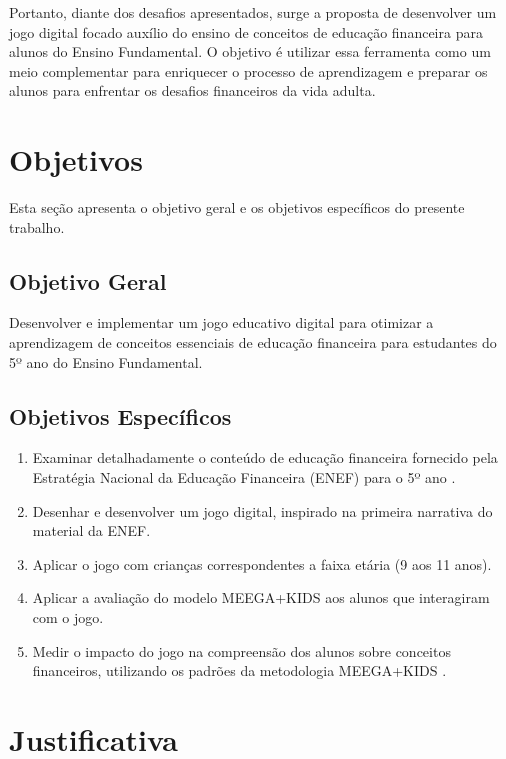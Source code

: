 Portanto, diante dos desafios apresentados, surge a proposta de desenvolver um jogo digital focado auxílio do ensino de conceitos de educação financeira para alunos do Ensino Fundamental. O objetivo é utilizar essa ferramenta como um meio complementar para enriquecer o processo de aprendizagem e preparar os alunos para enfrentar os desafios financeiros da vida adulta.

\section{Objetivos}
Esta seção apresenta o objetivo geral e os objetivos específicos do presente trabalho.

\subsection{Objetivo Geral}
Desenvolver e implementar um jogo educativo digital para otimizar a aprendizagem de conceitos essenciais de educação financeira para estudantes do 5º ano do Ensino Fundamental.

\subsection{Objetivos Específicos}
\begin{enumerate}[noitemsep,nosep,labelindent=\parindent,leftmargin=*,label={\alph*}) ]
	\item Examinar detalhadamente o conteúdo de educação financeira fornecido pela Estratégia Nacional da Educação Financeira (ENEF) para o 5º ano \cite{Educacao_financeira_nas_escolas}.
	\item Desenhar e desenvolver um jogo digital, inspirado na primeira narrativa do material da ENEF.
	\item Aplicar o jogo com crianças correspondentes a faixa etária (9 aos 11 anos).
	\item Aplicar a avaliação do modelo MEEGA+KIDS \cite{GresseVonWangenheim2020} aos alunos que interagiram com o jogo.
	\item Medir o impacto do jogo na compreensão dos alunos sobre conceitos financeiros, utilizando os padrões da metodologia MEEGA+KIDS \cite{GresseVonWangenheim2020}.
\end{enumerate}

\section{Justificativa}

